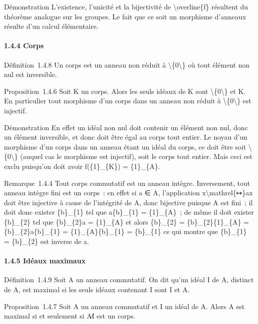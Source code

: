 \documentclass[]{article}
\begin{document}
Démonstration L'existence, l'unicité et la bijectivité de
\textbackslash{}overline\{f\} résultent du théorème analogue sur les
groupes. Le fait que ce soit un morphisme d'anneaux résulte d'un calcul
élémentaire.

\paragraph{1.4.4 Corps}

Définition~1.4.8 Un corps est un anneau non réduit à
\textbackslash{}\{0\textbackslash{}\} où tout élément non nul est
inversible.

Proposition~1.4.6 Soit K un corps. Alors les seuls idéaux de K sont
\textbackslash{}\{0\textbackslash{}\} et K. En particulier tout
morphisme d'un corps dans un anneau non réduit à
\textbackslash{}\{0\textbackslash{}\} est injectif.

Démonstration En effet un idéal non nul doit contenir un élément non
nul, donc un élément inversible, et donc doit être égal au corps tout
entier. Le noyau d'un morphisme d'un corps dans un anneau étant un idéal
du corps, ce doit être soit \textbackslash{}\{0\textbackslash{}\}
(auquel cas le morphisme est injectif), soit le corps tout entier. Mais
ceci est exclu puisqu'on doit avoir f(\{1\}\_\{K\}) = \{1\}\_\{A\}.

Remarque~1.4.4 Tout corps commutatif est un anneau intègre. Inversement,
tout anneau intègre fini est un corps~: en effet si a ∈ A, l'application
x\textbackslash{}mathrel\{↦\}ax doit être injective à cause de
l'intégrité de A, donc bijective puisque A est fini~; il doit donc
exister \{b\}\_\{1\} tel que a\{b\}\_\{1\} = \{1\}\_\{A\}~; de même il
doit exister \{b\}\_\{2\} tel que \{b\}\_\{2\}a = \{1\}\_\{A\} et alors
\{b\}\_\{2\} = \{b\}\_\{2\}\{1\}\_\{A\} = \{b\}\_\{2\}a\{b\}\_\{1\} =
\{1\}\_\{A\}\{b\}\_\{1\} = \{b\}\_\{1\} ce qui montre que \{b\}\_\{1\} =
\{b\}\_\{2\} est inverse de a.

\paragraph{1.4.5 Idéaux maximaux}

Définition~1.4.9 Soit A un anneau commutatif. On dit qu'un idéal I de A,
distinct de A, est maximal si les seuls idéaux contenant I sont I et A.

Proposition~1.4.7 Soit A un anneau commutatif et I un idéal de A. Alors
A est maximal si et seulement si A∕I est un corps.
\end{document}
